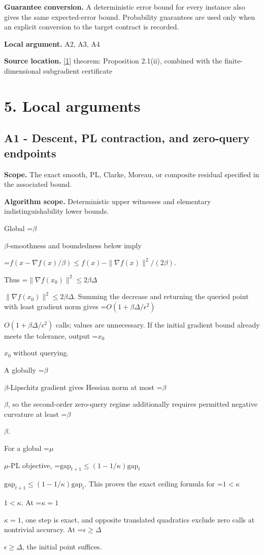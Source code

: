 \documentclass[10pt,a4paper]{article}
\newcommand{\AtlasMath}[1]{\par\begingroup\centering\setbox0=\hbox{$\displaystyle #1$}\ifdim\wd0>1.4\linewidth\typeout{ATLAS WIDE FORMULA: \the\wd0}\fi\ifdim\wd0>\linewidth\resizebox{\linewidth}{!}{\box0}\else\box0\fi\par\endgroup}
\newcommand{\AtlasInlineMath}[1]{\begingroup\setbox0=\hbox{$#1$}\ifdim\wd0>.4\linewidth\endgroup\AtlasMath{#1}\else\endgroup$#1$\fi}
\begin{document}
\textbf{Guarantee conversion.} A deterministic error bound for every instance also gives the same expected-error bound. Probability guarantees are used only when an explicit conversion to the target contract is recorded.

\textbf{Local argument.} A2, A3, A4

\textbf{Source location.} \href{https://www2.isye.gatech.edu/~nemirovs/MOR_AccuracyCertificates.pdf}{[1]} theorem: Proposition 2.1(ii), combined with the finite-dimensional subgradient certificate

\section{5. Local arguments}
\subsection{A1 - Descent, PL contraction, and zero-query endpoints}
\textbf{Scope.} The exact smooth, PL, Clarke, Moreau, or composite residual specified in the associated bound.

\textbf{Algorithm scope.} Deterministic upper witnesses and elementary indistinguishability lower bounds.

Global \AtlasInlineMath{\beta}-smoothness and boundedness below imply

\AtlasMath{f(x-\nabla f(x)/\beta)\le f(x)-\|\nabla f(x)\|^2/(2\beta).}

Thus \AtlasInlineMath{\|\nabla f(x_0)\|^2\le2\beta\Delta}. Summing the decrease and returning the queried point with least gradient norm gives \AtlasInlineMath{O(1+\beta\Delta/\epsilon^2)} calls; values are unnecessary. If the initial gradient bound already meets the tolerance, output \AtlasInlineMath{x_0} without querying.

A globally \AtlasInlineMath{\beta}-Lipschitz gradient gives Hessian norm at most \AtlasInlineMath{\beta}, so the second-order zero-query regime additionally requires permitted negative curvature at least \AtlasInlineMath{\beta}.

For a global \AtlasInlineMath{\mu}-PL objective,
\AtlasInlineMath{\mathrm{gap}_{t+1}\le(1-1/\kappa)\mathrm{gap}_t}.
This proves the exact ceiling formula for \AtlasInlineMath{1<\kappa}. At \AtlasInlineMath{\kappa=1}, one step is exact, and opposite translated quadratics exclude zero calls at nontrivial accuracy. At \AtlasInlineMath{\epsilon\ge\Delta}, the initial point suffices.
\end{document}
